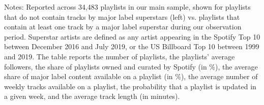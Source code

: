 \begin{table}[t!]
\caption{Characteristics of playlists without and with major label superstars.\label{tab:superstarplaylist}}
\smallskip{}
\raggedright{}
\begin{flushleft}
\vspace{-0.1cm}
\footnotesize{Notes: Reported across 34,483 playlists in our main sample, shown for playlists that do not contain tracks by major label superstars (left) vs. playlists that contain at least one track by a major label superstar during our observation period. Superstar artists are defined as any artist appearing in the Spotify Top 10 between December 2016 and July 2019, or the US Billboard Top 10 between 1999 and 2019. The table reports the number of playlists, the playlists' average followers, the share of playlists owned and curated by Spotify (in \%), the average share of major label content available on a playlist (in \%), the average number of weekly tracks available on a playlist, the probability that a playlist is updated in a given week, and the average track length (in minutes).}
\end{flushleft}
\end{table}